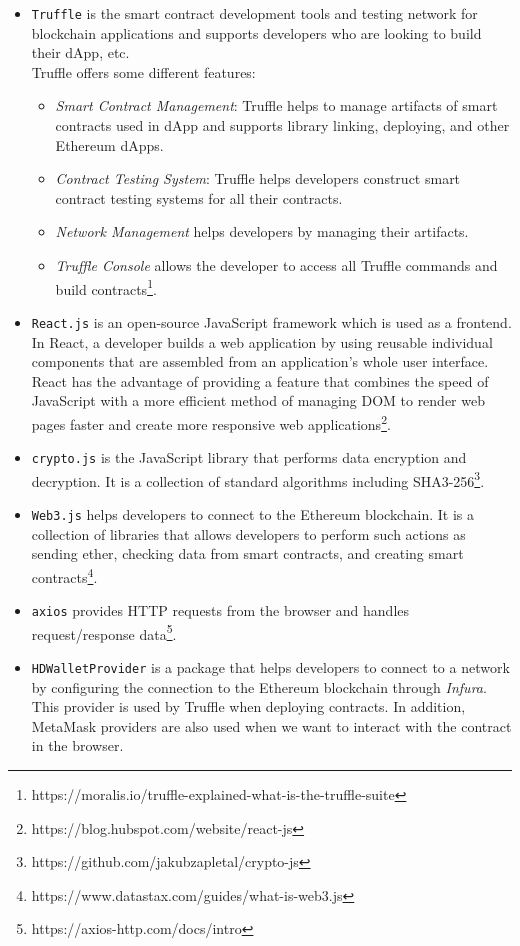 \begin{itemize}
  \item \texttt{Truffle} is the smart contract development tools and testing network for blockchain applications and supports developers who are looking to build their dApp, etc. \\
   Truffle offers some different features:
 \begin{itemize}
\item\textit{Smart Contract Management}: Truffle helps to manage artifacts of smart contracts used in dApp and supports library linking, deploying, and other Ethereum dApps. \\
 \item\textit{Contract Testing System}: Truffle helps developers construct smart contract testing systems for all their contracts. \\
 \item\textit{Network Management} helps developers by managing their artifacts. \\
 \item\textit{Truffle Console} allows the developer to access all Truffle commands and build contracts\footnote{https://moralis.io/truffle-explained-what-is-the-truffle-suite}.
 \end{itemize}

\item \texttt{React.js} is an open-source JavaScript framework which is used as a frontend. In React, a developer builds a web application by using reusable individual components that are assembled from an application's whole user interface.\\
React has the advantage of providing a feature that combines the speed of JavaScript with a more efficient method of managing DOM to render web pages faster and create more responsive web applications\footnote{https://blog.hubspot.com/website/react-js}.\\
\item \texttt{crypto.js} is the JavaScript library that performs data encryption and decryption. It is a collection of standard algorithms including SHA3-256\footnote{{https://github.com/jakubzapletal/crypto-js}}.
\item \texttt{Web3.js} helps developers to connect to the Ethereum blockchain. It is a collection of libraries that allows developers to perform such actions as sending ether, checking data from smart contracts, and creating smart contracts\footnote{https://www.datastax.com/guides/what-is-web3.js}.\\
\item \texttt{axios} provides HTTP requests from the browser and handles request/response data\footnote{https://axios-http.com/docs/intro}.\\
\item \texttt{HDWalletProvider} is a package that helps developers to connect to a network by configuring the connection to the Ethereum blockchain through \textit{Infura}. This provider is used by Truffle when deploying contracts. In addition, MetaMask providers are also used when we want to interact with the contract in the browser. 


\end{itemize}
